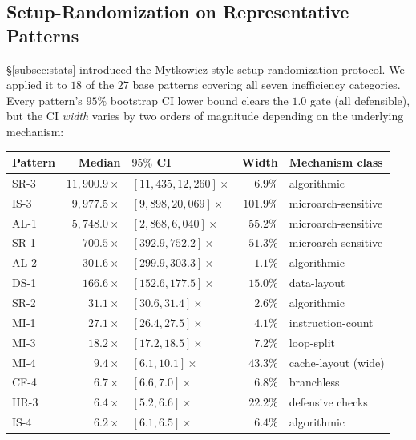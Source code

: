 \subsection{Setup-Randomization on Representative Patterns}\label{subsec:results-stats}

\S\ref{subsec:stats} introduced the Mytkowicz-style setup-randomization protocol. We applied it to $18$ of the $27$ base patterns covering all seven inefficiency categories. Every pattern's $95\%$ bootstrap CI lower bound clears the $1.0$ gate (all defensible), but the CI \emph{width} varies by two orders of magnitude depending on the underlying mechanism:

\begin{center}
\small
\begin{tabular}{lrlrl}
\toprule
\textbf{Pattern} & \textbf{Median} & \textbf{$95\%$ CI} & \textbf{Width} & \textbf{Mechanism class} \\
\midrule
SR-3 & $11{,}900.9\times$ & $[11{,}435, 12{,}260]\times$ & $6.9\%$  & algorithmic \\
IS-3 & $9{,}977.5\times$  & $[9{,}898, 20{,}069]\times$  & $101.9\%$& microarch-sensitive \\
AL-1 & $5{,}748.0\times$  & $[2{,}868, 6{,}040]\times$   & $55.2\%$ & microarch-sensitive \\
SR-1 & $700.5\times$      & $[392.9, 752.2]\times$        & $51.3\%$ & microarch-sensitive \\
AL-2 & $301.6\times$      & $[299.9, 303.3]\times$        & $1.1\%$  & algorithmic \\
DS-1 & $166.6\times$      & $[152.6, 177.5]\times$        & $15.0\%$ & data-layout \\
SR-2 & $31.1\times$       & $[30.6, 31.4]\times$          & $2.6\%$  & algorithmic \\
MI-1 & $27.1\times$       & $[26.4, 27.5]\times$          & $4.1\%$  & instruction-count \\
MI-3 & $18.2\times$       & $[17.2, 18.5]\times$          & $7.2\%$  & loop-split \\
MI-4 & $9.4\times$        & $[6.1, 10.1]\times$           & $43.3\%$ & cache-layout (wide) \\
CF-4 & $6.7\times$        & $[6.6, 7.0]\times$            & $6.8\%$  & branchless \\
HR-3 & $6.4\times$        & $[5.2, 6.6]\times$            & $22.2\%$ & defensive checks \\
IS-4 & $6.2\times$        & $[6.1, 6.5]\times$            & $6.4\%$  & algorithmic \\

\end{tabular}
\end{center}
